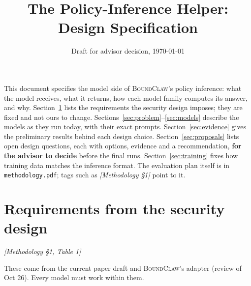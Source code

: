 \documentclass[10pt]{article}
\title{The Policy-Inference Helper: Design Specification}
\date{Draft for advisor decision, \today}
\newcommand{\BC}{{\mdseries\textsc{BoundClaw}}}
\newcommand{\M}[1]{\textit{[Methodology #1]}}
\begin{document}
\maketitle

\noindent This document specifies the model side of \BC{}'s policy inference: what the model receives, what it
returns, how each model family computes its answer, and why. Section~\ref{sec:req} lists the requirements
the security design imposes; they are fixed and not ours to change. Sections~\ref{sec:problem}--\ref{sec:models}
describe the models as they run today, with their exact prompts. Section~\ref{sec:evidence} gives the
preliminary results behind each design choice. Section~\ref{sec:proposals} lists open design questions, each
with options, evidence and a recommendation, \textbf{for the advisor to decide} before the final runs.
Section~\ref{sec:training} fixes how training data matches the inference format. The evaluation plan itself
is in \texttt{methodology.pdf}; tags such as \M{\S1} point to it.

\section{Requirements from the security design}\label{sec:req}
\M{\S1, Table 1}

These come from the current paper draft and \BC{}'s adapter (review of Oct 26). Every model must work within them.
\end{document}
